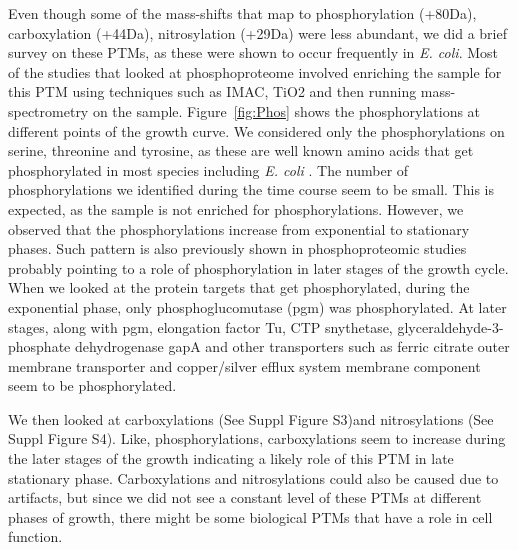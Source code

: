 \documentclass[12pt]{article}
\begin{document}
Even though some of the mass-shifts that map to phosphorylation (+80Da), carboxylation (+44Da), nitrosylation (+29Da) were less abundant, we did a brief survey on these PTMs, as these were shown to occur frequently in \emph{E. coli}. Most of the studies that looked at phosphoproteome involved enriching the sample for this PTM using techniques such as IMAC, TiO2 and then running mass-spectrometry on the sample. Figure~\ref{fig:Phos} shows the phosphorylations at different points of the growth curve. We considered only the phosphorylations on serine, threonine and tyrosine, as these are well known amino acids that get phosphorylated in most species including \emph{E. coli} \cite{Maceketal2008}. The number of phosphorylations we identified during the time course seem to be small. This is expected, as the sample is not enriched for phosphorylations. However, we observed that the phosphorylations increase from exponential to stationary phases. Such pattern is also previously shown in phosphoproteomic studies \cite{Soaresetal2013} probably pointing to a role of phosphorylation in later stages of the growth cycle. When we looked at the protein targets that get phosphorylated, during the exponential phase, only phosphoglucomutase (pgm) was phosphorylated. At later stages, along with pgm, elongation factor Tu, CTP snythetase, glyceraldehyde-3-phosphate dehydrogenase gapA and other transporters such as ferric citrate outer membrane transporter and copper/silver efflux system membrane component seem to be phosphorylated. 

We then looked at carboxylations (See Suppl Figure S3)and nitrosylations (See Suppl Figure S4). Like, phosphorylations, carboxylations seem to increase during the later stages of the growth indicating a likely role of this PTM in late stationary phase. Carboxylations and nitrosylations could also be caused due to artifacts, but since we did not see a constant level of these PTMs at different phases of growth, there might be some biological PTMs that have a role in cell function. 
\end{document}
